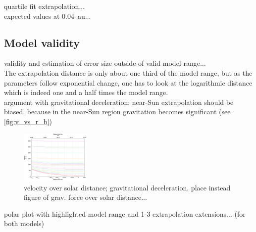 quartile fit extrapolation...\\

expected values at 0.04~au...\\

\subsection{Model validity}
validity and estimation of error size outside of valid model range...\\

The extrapolation distance is only about one third of the model range, but as the parameters follow exponential change, one has to look at the logarithmic distance which is indeed one and a half times the model range.\\

argument with gravitational deceleration; near-Sun extrapolation should be biased, because in the near-Sun region gravitation becomes significant (see \autoref{fig:v_vs_r_b})\\
\begin{figure}[htb]
	\centering
	\includegraphics[width=0.3\textwidth]{images/gnuplots/v_vs_r_b.png}
	\caption{velocity over solar distance; gravitational deceleration. place instead figure of grav. force over solar distance...}
	\label{fig:v_vs_r_b}
\end{figure}

polar plot with highlighted model range and 1-3 extrapolation extensions... (for both models)\\

